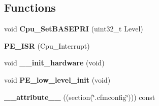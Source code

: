 \subsection*{Functions}
\begin{DoxyCompactItemize}
\item 
\hypertarget{group___cpu__module_ga0ee0366b566c5a7b6088ef899c4d19a7}{}void {\bfseries Cpu\+\_\+\+Set\+B\+A\+S\+E\+P\+R\+I} (uint32\+\_\+t Level)\label{group___cpu__module_ga0ee0366b566c5a7b6088ef899c4d19a7}

\item 
\hypertarget{group___cpu__module_gafa0067fa0d355a26ca9894983c01be6f}{}{\bfseries P\+E\+\_\+\+I\+S\+R} (Cpu\+\_\+\+Interrupt)\label{group___cpu__module_gafa0067fa0d355a26ca9894983c01be6f}

\item 
\hypertarget{group___cpu__module_ga32a8d86789a3326b3120bf1e1c1d4252}{}void {\bfseries \+\_\+\+\_\+init\+\_\+hardware} (void)\label{group___cpu__module_ga32a8d86789a3326b3120bf1e1c1d4252}

\item 
\hypertarget{group___cpu__module_ga95039f54c45f24c1b4ed640fa2f63f11}{}void {\bfseries P\+E\+\_\+low\+\_\+level\+\_\+init} (void)\label{group___cpu__module_ga95039f54c45f24c1b4ed640fa2f63f11}

\item 
\hypertarget{group___cpu__module_ga2d9b5b981f451cdf47bf43b4f9cc9e03}{}{\bfseries \+\_\+\+\_\+attribute\+\_\+\+\_\+} ((section(\char`\"{}.cfmconfig\char`\"{}))) const\label{group___cpu__module_ga2d9b5b981f451cdf47bf43b4f9cc9e03}

\end{DoxyCompactItemize}

